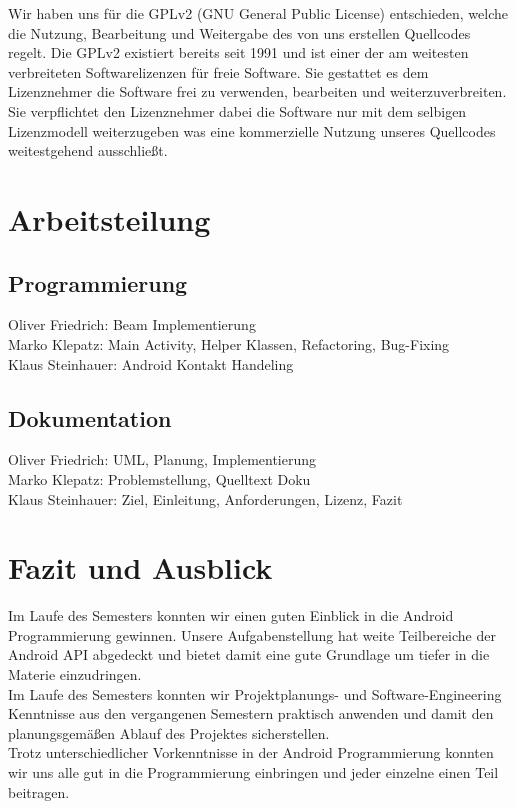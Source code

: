 \documentclass[a4paper,ngerman,12pt]{scrreprt}
\newcommand{\+}{\discretionary{\mbox{\scriptsize$\hookleftarrow$}}{}{}}
\begin{document}
Wir haben uns für die G\+P\+Lv2 (G\+NU General Public License) entschieden, welche die Nutzung, Bearbeitung und Weitergabe des von uns erstellen Quellcodes regelt. Die G\+P\+Lv2 existiert bereits seit 1991 und ist einer der am weitesten verbreiteten Softwarelizenzen für freie Software. Sie gestattet es dem Lizenznehmer die Software frei zu verwenden, bearbeiten und weiterzuverbreiten. Sie verpflichtet den Lizenznehmer dabei die Software nur mit dem selbigen Lizenzmodell weiterzugeben was eine kommerzielle Nutzung unseres Quellcodes weitestgehend ausschließt. 

\chapter{Arbeitsteilung}
\section*{Programmierung}

Oliver Friedrich\+: Beam Implementierung \\ 
Marko Klepatz\+: Main Activity, Helper Klassen, Refactoring, Bug-\/\+Fixing\\
Klaus Steinhauer\+: Android Kontakt Handeling\\ 

\section*{Dokumentation}

Oliver Friedrich\+: U\+ML, Planung, Implementierung\\
Marko Klepatz\+: Problemstellung, Quelltext Doku\\
Klaus Steinhauer\+: Ziel, Einleitung, Anforderungen, Lizenz, Fazit\\

\chapter{Fazit und Ausblick}

Im Laufe des Semesters konnten wir einen guten Einblick in die Android Programmierung gewinnen. Unsere Aufgabenstellung hat weite Teilbereiche der Android A\+PI abgedeckt und bietet damit eine gute Grundlage um tiefer in die Materie einzudringen. \\
Im Laufe des Semesters konnten wir Projektplanungs-\/ und Software-\/\+Engineering Kenntnisse aus den vergangenen Semestern praktisch anwenden und damit den planungsgemäßen Ablauf des Projektes sicherstellen.\\ 
Trotz unterschiedlicher Vorkenntnisse in der Android Programmierung konnten wir uns alle gut in die Programmierung einbringen und jeder einzelne einen Teil beitragen.
\end{document}

